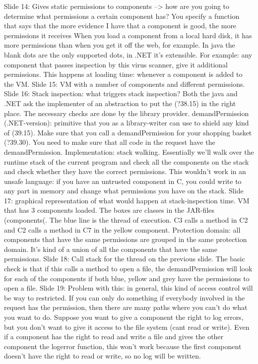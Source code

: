 \documentclass[10pt,a4paper]{report}
\begin{document}
Slide 14: Gives static permissions to components --> how are you going to determine what permissions a certain component has? You specify a function that says that the more evidence I have that a component is good, the more permissions it receives
When you load a component from a local hard disk, it has more permissions than when you get it off the web, for example.
In java the blank dots are the only supported dots, in .NET it's extensible.
For example: any component that passes inspection by this virus scanner, give it additional permissions.
This happens at loading time: whenever a component is added to the VM.
Slide 15: VM with a number of components and different permissions. 
Slide 16: Stack inspection: what triggers stack inspection? Both the java and .NET ask the implementer of an abstraction to put the (?38.15) in the right place. The necessary checks are done by the library provider.
demandPermission (.NET-version): primitive that you as a library-writer can use to shield any kind of (39.15).
Make sure that you call a demandPermission for your shopping basket (?39.30).
You need to make sure that all code in the request have the demandPermission. 
Implementation: stack walking. Essentially we'll walk over the runtime stack of the current program and check all the components on the stack and check whether they have the correct permissions.
This wouldn't work in an unsafe language: if you have an untrusted component in C, you could write to any part in memory and change what permissions you have on the stack. 
Slide 17: graphical representation of what would happen at stack-inspection time. VM that has 3 components loaded. The boxes are classes in the JAR-files (components(. The blue line is the thread of execution. C3 calls a method in C2 and C2 calls a method in C7 in the yellow component.
Protection domain: all components that have the same permissions are grouped in the same protection domain. It's kind of a union of all the components that have the same permissions.
Slide 18: Call stack for the thread on the previous slide. The basic check is that if this calls a method to open a file, the demandPermission will look for each of the components if both blue, yellow and grey have the permissions to open a file. 
Slide 19: Problem with this: in general, this kind of access control will be way to restricted. If you can only do something if everybody involved in the request has the permission, then there are many paths where you can't do what you want to do.
Suppose you want to give a component the right to log errors, but you don't want to give it access to the file system (cant read or write). Even if a component has the right to read and write a file and gives the other component the logerror function, this won't work because the first component doesn't have the right to read or write, so no log will be written.
\end{document}
